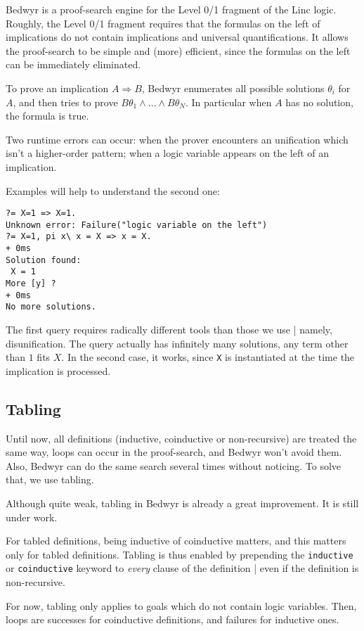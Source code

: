 \documentclass{article}
\begin{document}
Bedwyr is a proof-search engine for the Level 0/1 fragment of the Linc logic.
Roughly, the Level 0/1 fragment requires that the formulas on the left of
implications do not contain implications and universal quantifications.
It allows the proof-search to be simple and (more) efficient,
since the formulas on the left can be immediately eliminated.

To prove an implication $A\Rightarrow B$,
Bedwyr enumerates all possible solutions $\theta_i$ for $A$,
and then tries to prove $B\theta_1\wedge\dots\wedge B\theta_N$.
In particular when $A$ has no solution, the formula is true.

Two runtime errors can occur:
when the prover encounters an unification which isn't a higher-order pattern;
when a logic variable appears on the left of an implication.

Examples will help to understand the second one:
\begin{verbatim}
?= X=1 => X=1.
Unknown error: Failure("logic variable on the left")
?= X=1, pi x\ x = X => x = X.
+ 0ms
Solution found:
 X = 1
More [y] ?
+ 0ms
No more solutions.
\end{verbatim}
The first query requires radically different tools than those we use |
namely, disunification. The query actually has infinitely many solutions,
any term other than $1$ fits $X$.
In the second case, it works, since \verb.X. is instantiated at the time the
implication is processed.

\subsection{Tabling}

Until now, all definitions (inductive, coinductive or non-recursive)
are treated the same way, loops can occur in the proof-search, and Bedwyr
won't avoid them. Also, Bedwyr can do the same search several times without
noticing. To solve that, we use tabling.

Although quite weak, tabling in Bedwyr is already a great improvement.
It is still under work.

For tabled definitions, being inductive of coinductive matters, and this 
matters only for tabled definitions.
Tabling is thus enabled by prepending the \texttt{inductive} or
\texttt{coinductive} keyword to \emph{every} clause of the definition |
even if the definition is non-recursive.

For now, tabling only applies to goals which do not contain logic variables.
Then, loops are successes for coinductive definitions,
and failures for inductive ones.
\end{document}
